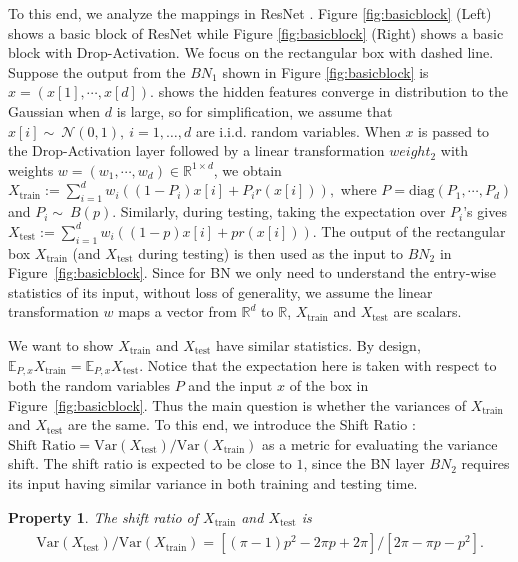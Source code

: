 \documentclass[11pt]{article}
\newtheorem{property}[theorem]{Property}
\begin{document}
To this end, we analyze the mappings in ResNet \cite{resnet}. Figure \ref{fig:basicblock} (Left) shows a basic block of ResNet while Figure \ref{fig:basicblock} (Right) shows a basic block with Drop-Activation. We focus on the rectangular box with dashed line. Suppose the output from the $BN_1$ shown in Figure \ref{fig:basicblock} is $x = (x[1],\cdots,x[d])$. \cite{lee2019wide} shows the hidden features converge in distribution to the Gaussian when $d$ is large, so for simplification, we assume that $x[i]\sim\ \mathcal{N}(0,1),\ i=1,\ldots,d$ are i.i.d. random variables. When $x$ is passed to the Drop-Activation layer followed by a linear transformation $weight_2$ with weights $w= (w_1,\cdots,w_d) \in \mathbb{R}^{1\times d} $, we obtain
$
X_\text{train}:=\sum_{i=1}^d w_{i}((1-P_i)x[i] + P_ir(x[i])),
$
where $P = \text{diag}(P_1,\cdots,P_d)$ and $P_i\sim\ B(p)$. Similarly, during testing, taking the expectation over $P_i$'s gives
$
X_\text{test}:=\sum_{i=1}^d w_{i}((1-p)x[i] + pr(x[i])).
$
The output of the rectangular box $X_\text{train}$ (and $X_\text{test}$ during testing) is then used as the input to $BN_2$ in Figure~\ref{fig:basicblock}. Since for BN we only need to understand the entry-wise statistics of its input, without loss of generality, we assume the linear transformation $w$ maps a vector from $\mathbb{R}^d$ to $\mathbb{R}$, $X_\text{train}$ and $X_\text{test}$ are scalars.

We want to show $X_\text{train}$ and $X_\text{test}$ have similar statistics. By design, $\mathbb{E}_{P,x} X_\text{train}= \mathbb{E}_{P,x} X_\text{test}$. Notice that the expectation here is taken with respect to both the random variables $P$ and the input $x$ of the box in Figure~\ref{fig:basicblock}. Thus the main question is whether the variances of $X_\text{train}$ and $X_\text{test}$ are the same. To this end, we introduce the Shift Ratio \cite{BNandDropout}:
$
\text{Shift Ratio} = \text{Var}(X_\text{test})/\text{Var}(X_\text{train})
$
 as a metric for evaluating the variance shift. The shift ratio is expected to be close to $1$, since the BN layer $BN_2$ requires its input having similar variance in both training and testing time.
\begin{property}
The shift ratio of $X_\text{train}$ and $X_\text{test}$ is
\begin{align}
\begin{split}
\text{Var}(X_\text{test})/\text{Var}(X_\text{train}) = [(\pi -1)p^2 - 2\pi p + 2\pi]/[2\pi - \pi p -p^2].
\end{split}
\label{formula}
\end{align}
\label{prop2}
\vspace{-0.5cm}
\end{property}
\end{document}
